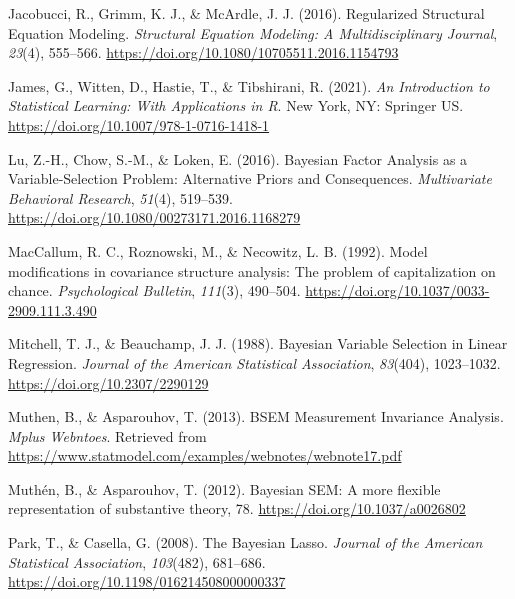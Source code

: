 \documentclass[
  man, donotrepeattitle,floatsintext]{apa6}
\newlength{\cslhangindent}
\newlength{\cslentryspacingunit} %
\newenvironment{CSLReferences}[2] %
 {%
  \setlength{\parindent}{0pt}
  \ifodd #1
  \let\oldpar\par
  \def\par{\hangindent=\cslhangindent\oldpar}
  \fi
  \setlength{\parskip}{#2\cslentryspacingunit}
 }%
 {}
\begin{document}
\begin{CSLReferences}{1}{0}
\leavevmode{}%
Jacobucci, R., Grimm, K. J., \& McArdle, J. J. (2016). Regularized {Structural} {Equation} {Modeling}. \emph{Structural Equation Modeling: A Multidisciplinary Journal}, \emph{23}(4), 555--566. \url{https://doi.org/10.1080/10705511.2016.1154793}

\leavevmode{}%
James, G., Witten, D., Hastie, T., \& Tibshirani, R. (2021). \emph{An {Introduction} to {Statistical} {Learning}: With {Applications} in {R}}. New York, NY: Springer US. \url{https://doi.org/10.1007/978-1-0716-1418-1}

\leavevmode{}%
Lu, Z.-H., Chow, S.-M., \& Loken, E. (2016). Bayesian {Factor} {Analysis} as a {Variable}-{Selection} {Problem}: {Alternative} {Priors} and {Consequences}. \emph{Multivariate Behavioral Research}, \emph{51}(4), 519--539. \url{https://doi.org/10.1080/00273171.2016.1168279}

\leavevmode{}%
MacCallum, R. C., Roznowski, M., \& Necowitz, L. B. (1992). Model modifications in covariance structure analysis: The problem of capitalization on chance. \emph{Psychological Bulletin}, \emph{111}(3), 490--504. \url{https://doi.org/10.1037/0033-2909.111.3.490}

\leavevmode{}%
Mitchell, T. J., \& Beauchamp, J. J. (1988). Bayesian {Variable} {Selection} in {Linear} {Regression}. \emph{Journal of the American Statistical Association}, \emph{83}(404), 1023--1032. \url{https://doi.org/10.2307/2290129}

\leavevmode{}%
Muthen, B., \& Asparouhov, T. (2013). {BSEM} {Measurement} {Invariance} {Analysis}. \emph{Mplus Webntoes}. Retrieved from \url{https://www.statmodel.com/examples/webnotes/webnote17.pdf}

\leavevmode{}%
Muthén, B., \& Asparouhov, T. (2012). Bayesian {SEM}: {A} more ﬂexible representation of substantive theory, 78. \url{https://doi.org/10.1037/a0026802}

\leavevmode{}%
Park, T., \& Casella, G. (2008). The {Bayesian} {Lasso}. \emph{Journal of the American Statistical Association}, \emph{103}(482), 681--686. \url{https://doi.org/10.1198/016214508000000337}


\end{CSLReferences}
\end{document}
